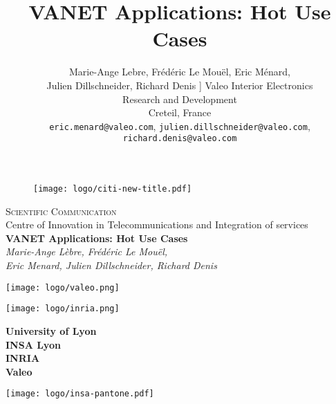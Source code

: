 \documentclass[a4paper]{article}
\begin{document}
\pagestyle{empty}
\begin{center}
\begin{figure}\centering
\texttt{[image: logo/citi-new-title.pdf]}\end{figure}
{\LARGE \textsc{Scientific Communication}} \\
\vspace{0.5cm}
{Centre of Innovation in Telecommunications and Integration of services} \\

\vspace{3cm}
{\Large \textbf{VANET Applications: Hot Use Cases}} \\
\vspace{10pt}
{\large \textit{Marie-Ange Lèbre, Frédéric Le Mouël, \\Eric Menard, Julien Dillschneider, Richard Denis}} \\
\vspace{10pt}

\begin{minipage}{0.8\columnwidth}
\sffamily
\small
\end{minipage}
\end{center}
\vfill
\begin{center}
\texttt{[image: logo/valeo.png]}
\end{center}
\begin{minipage}[b]{0.3\columnwidth}
\texttt{[image: logo/inria.png]}\end{minipage}
\hfill
\begin{minipage}{0.3\columnwidth}
\small
\centering
\textbf{
University of Lyon \\
INSA Lyon \\
INRIA\\
Valeo
}
\end{minipage}
\hfill
\begin{minipage}[b]{0.25\columnwidth}
\texttt{[image: logo/insa-pantone.pdf]}\end{minipage}
\newpage

\title{VANET Applications: Hot Use Cases}

\author{Marie-Ange Lebre, Frédéric Le Mouël, Eric Ménard,\\
Julien Dillschneider, Richard Denis \10pt]
Valeo Interior Electronics\\
Research and Development\\
Creteil, France\\
\texttt{eric.menard@valeo.com}, \texttt{julien.dillschneider@valeo.com}, \texttt{richard.denis@valeo.com}}
\end{document}
